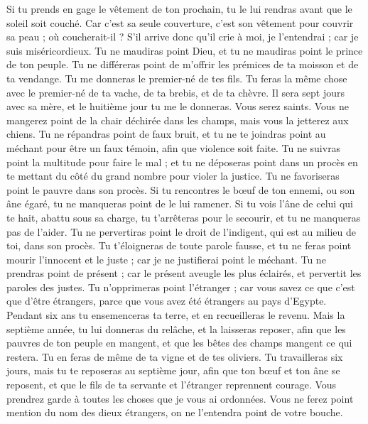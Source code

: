 \begin{multicols}{2}
Si tu prends en gage le vêtement de ton prochain, tu le lui rendras avant que le soleil soit couché.
Car c'est sa seule couverture, c'est son vêtement pour couvrir sa peau ; où coucherait-il ? S'il arrive donc qu'il crie à moi, je l'entendrai ; car je suis miséricordieux.
Tu ne maudiras point Dieu, et tu ne maudiras point le prince de ton peuple.
Tu ne différeras point de m'offrir les prémices de ta moisson et de ta vendange. Tu me donneras le premier-né de tes fils.
Tu feras la même chose avec le premier-né de ta vache, de ta brebis, et de ta chèvre. Il sera sept jours avec sa mère, et le huitième jour tu me le donneras.
Vous serez saints. Vous ne mangerez point de la chair déchirée dans les champs, mais vous la jetterez aux chiens.
\VerseOne{}Tu ne répandras point de faux bruit, et tu ne te joindras point au méchant pour être un faux témoin, afin que violence soit faite.
Tu ne suivras point la multitude pour faire le mal ; et tu ne déposeras point dans un procès en te mettant du côté du grand nombre pour violer la justice.
Tu ne favoriseras point le pauvre dans son procès.
Si tu rencontres le bœuf de ton ennemi, ou son âne égaré, tu ne manqueras point de le lui ramener.
Si tu vois l'âne de celui qui te hait, abattu sous sa charge, tu t'arrêteras pour le secourir, et tu ne manqueras pas de l'aider.
Tu ne pervertiras point le droit de l'indigent, qui est au milieu de toi, dans son procès.
Tu t'éloigneras de toute parole fausse, et tu ne feras point mourir l'innocent et le juste ; car je ne justifierai point le méchant.
Tu ne prendras point de présent ; car le présent aveugle les plus éclairés, et pervertit les paroles des justes.
Tu n'opprimeras point l'étranger ; car vous savez ce que c'est que d'être étrangers, parce que vous avez été étrangers au pays d'Egypte.
Pendant six ans tu ensemenceras ta terre, et en recueilleras le revenu.
Mais la septième année, tu lui donneras du relâche, et la laisseras reposer, afin que les pauvres de ton peuple en mangent, et que les bêtes des champs mangent ce qui restera. Tu en feras de même de ta vigne et de tes oliviers.
Tu travailleras six jours, mais tu te reposeras au septième jour, afin que ton bœuf et ton âne se reposent, et que le fils de ta servante et l'étranger reprennent courage.
Vous prendrez garde à toutes les choses que je vous ai ordonnées. Vous ne ferez point mention du nom des dieux étrangers, on ne l'entendra point de votre bouche.

\end{multicols}
